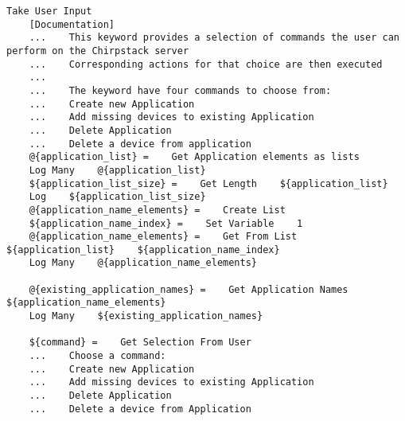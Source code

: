 \begin{verbatim}
Take User Input
    [Documentation]
    ...    This keyword provides a selection of commands the user can perform on the Chirpstack server
    ...    Corresponding actions for that choice are then executed
    ...
    ...    The keyword have four commands to choose from:
    ...    Create new Application
    ...    Add missing devices to existing Application
    ...    Delete Application
    ...    Delete a device from application
    @{application_list} =    Get Application elements as lists
    Log Many    @{application_list}
    ${application_list_size} =    Get Length    ${application_list}
    Log    ${application_list_size}
    @{application_name_elements} =    Create List
    ${application_name_index} =    Set Variable    1
    @{application_name_elements} =    Get From List    ${application_list}    ${application_name_index}
    Log Many    @{application_name_elements}

    @{existing_application_names} =    Get Application Names    ${application_name_elements}
    Log Many    ${existing_application_names}

    ${command} =    Get Selection From User
    ...    Choose a command:
    ...    Create new Application
    ...    Add missing devices to existing Application
    ...    Delete Application
    ...    Delete a device from Application


\end{verbatim}
